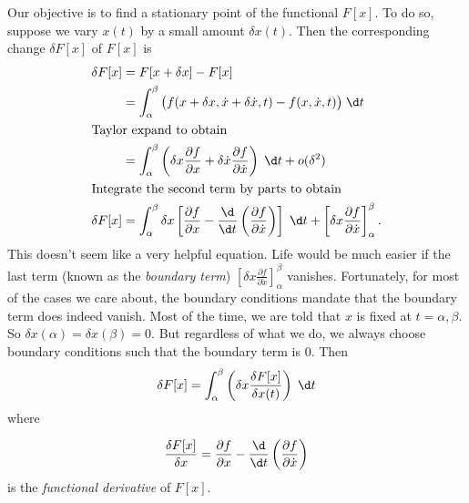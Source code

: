 \documentclass[a4paper]{article}
\begin{document}
Our objective is to find a stationary point of the functional $F[x]$. To do so, suppose we vary $x(t)$ by a small amount $\delta x(t)$. Then the corresponding change $\delta F[x]$ of $F[x]$ is
\begin{align*}
  \delta F[x] &= F[x + \delta x] - F[x]\\
  &= \int_\alpha ^\beta \big(f(x + \delta x, \dot{x} + \delta \dot{x}, t) - f(x, \dot{x}, t)\big)\;\d t\\
  \intertext{Taylor expand to obtain}
  &= \int_\alpha^\beta  \left(\delta x\frac{\partial f}{\partial x} + \delta \dot{x} \frac{\partial f}{\partial \dot{x}}\right)\;\d t + o(\delta^2)\\
  \intertext{Integrate the second term by parts to obtain}
  \delta F[x] &= \int_\alpha^\beta\delta x\left[\frac{\partial f}{\partial x} - \frac{\d}{\d t}\left(\frac{\partial f}{\partial \dot{x}}\right)\right]\;\d t + \left[ \delta x\frac{\partial f}{\partial \dot{x}}\right]_\alpha^\beta.
\end{align*}
This doesn't seem like a very helpful equation. Life would be much easier if the last term (known as the \emph{boundary term}) $\left[ \delta x\frac{\partial f}{\partial \dot{x}}\right]_\alpha^\beta$ vanishes. Fortunately, for most of the cases we care about, the boundary conditions mandate that the boundary term does indeed vanish. Most of the time, we are told that $x$ is fixed at $t = \alpha, \beta$. So $\delta x(\alpha) = \delta x(\beta) = 0$. But regardless of what we do, we always choose boundary conditions such that the boundary term is 0. Then
\[
  \delta F[x] = \int_\alpha ^\beta \left(\delta x \frac{\delta F[x]}{\delta x(t)}\right)\;\d t
\]
where
\begin{defi}
  \[
    \frac{\delta F[x]}{\delta x} = \frac{\partial f}{\partial x} - \frac{\d }{\d t}\left(\frac{\partial f}{\partial \dot{x}}\right)
  \]
  is the \emph{functional derivative} of $F[x]$.
\end{defi}
\end{document}
